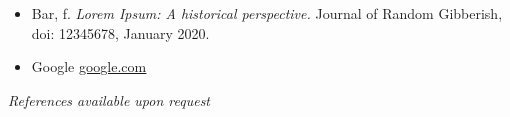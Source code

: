 \vspace{-0.5cm}
\vfill\null
{}

\vspace{-0.3cm}
\begin{itemize}[leftmargin=0.5cm]
  \item Bar, f. \textit{Lorem Ipsum: A historical perspective.} Journal of Random Gibberish, doi: 12345678, January 2020.
\end{itemize}

\begin{itemize}[leftmargin=0.5cm]
    \item Google \href{https://www.google.com}{\underline{google.com}}
\end{itemize}

\vspace{16pt}
\begin{center}
    \textit{References available upon request}
\end{center}

\vfill\null